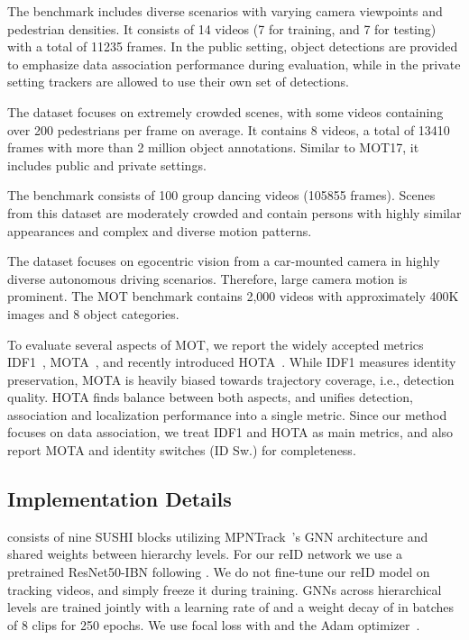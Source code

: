 \documentclass[10pt,twocolumn,letterpaper]{article}
\begin{document}
{{ The benchmark includes diverse scenarios with varying camera viewpoints and pedestrian densities. It consists of 14 videos (7 for training,  and 7 for testing) with a total of 11235 frames.  In the public setting, object detections are provided to emphasize data association performance during evaluation, while in the private setting trackers are allowed to use their own set of detections. 

 The dataset focuses on extremely crowded scenes, with some videos containing over 200 pedestrians per frame on average. It contains 8 videos, a total of 13410 frames with more than 2 million object annotations. Similar to MOT17, it includes public and private settings.

 The benchmark consists of 100 group dancing videos (105855 frames). Scenes from this dataset are moderately crowded and contain persons with highly similar appearances and complex and diverse motion patterns. 

 The dataset focuses on egocentric vision from a car-mounted camera in highly diverse autonomous driving scenarios. Therefore, large camera motion is prominent. The MOT benchmark contains 2,000 videos with approximately 400K images and 8 object categories.


  To evaluate several aspects of MOT, we report the widely accepted metrics IDF1~\cite{idf1}, MOTA~\cite{clear}, and recently introduced HOTA~\cite{hota}. While IDF1 measures identity preservation, MOTA is heavily biased towards trajectory coverage, i.e., detection quality. HOTA finds balance between both aspects, and unifies detection, association and localization performance into a single metric. Since our method focuses on data association, we treat IDF1 and HOTA as main metrics, and also report MOTA and identity switches (ID Sw.) for completeness.

\subsection{Implementation Details} 
   \modelname consists of nine SUSHI blocks utilizing MPNTrack~\cite{mpntrack}'s GNN architecture and shared weights between hierarchy levels. For our reID network we use a pretrained ResNet50-IBN following \cite{lpc}. We do not fine-tune our reID model on tracking videos, and simply freeze it during training. GNNs across hierarchical levels are trained jointly with a learning rate of  and a weight decay of  in batches of 8 clips for 250 epochs. We use focal loss with  and the Adam optimizer~\cite{adam}. 

}}
\end{document}
